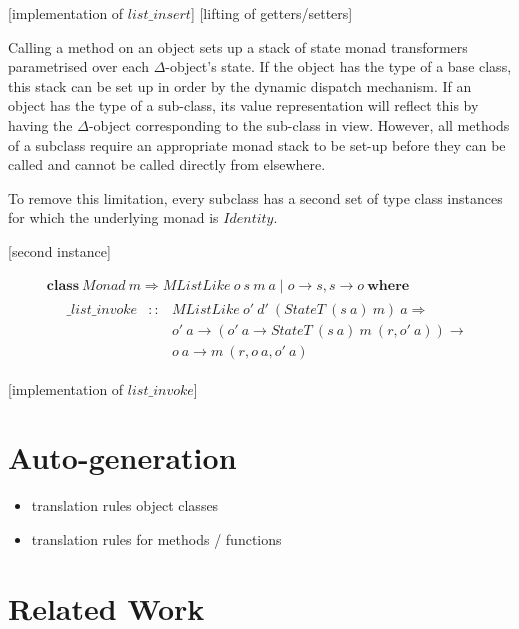 \documentclass[runningheads,a4paper]{llncs}
\newcommand{\todo}[1]{[{\color{blue}#1}]}
\begin{document}
\todo{implementation of $\mathit{list}\_\mathit{insert}$}
\todo{lifting of getters/setters}

Calling a method on an object sets up a stack of state monad transformers parametrised over each $\Delta$-object's state. If the object has the type of a base class, this stack can be set up in order by the dynamic dispatch mechanism. If an object has the type of a sub-class, its value representation will reflect this by having the $\Delta$-object corresponding to the sub-class in view. However, all methods of a subclass require an appropriate monad stack to be set-up before they can be called and cannot be called directly from elsewhere.

To remove this limitation, every subclass has a second set of type class instances for which the underlying monad is $\mathit{Identity}$.

\todo{second instance}

\begin{displaymath}
\begin{array}{l}
\mathbf{class}~\mathit{Monad}~m \Rightarrow \mathit{MListLike}~o~s~m~a \mid o \to s, s \to o~\mathbf{where} \\
\quad \begin{array}{lcl}
\_\mathit{list}\_\mathit{invoke} & :: & \mathit{MListLike}~o'~d'~(\mathit{StateT}~(s~a)~m)~a \Rightarrow\\
                                 &    & o'~a \to (o'~a \to \mathit{StateT}~(s~a)~m~(r,o'~a)) \to\\
                                 &    & o~a \to m~(r,o~a,o'~a)
\end{array} 
\end{array}
\end{displaymath}

\todo{implementation of $\mathit{list}\_\mathit{invoke}$}

\section{Auto-generation}
\label{sec:auto}

\begin{itemize}
\item translation rules object classes
\item translation rules for methods / functions
\end{itemize}

\section{Related Work}
\label{sec:related}
\end{document}
